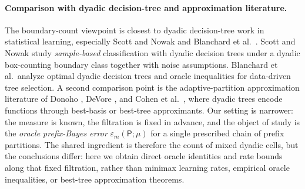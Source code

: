 \paragraph{Comparison with dyadic decision-tree and approximation literature.}
The boundary-count viewpoint is closest to dyadic decision-tree work in
statistical learning, especially Scott and Nowak \cite{ScottNowak2006} and
Blanchard et al.~\cite{BlanchardSchaferRozenholcMuller2007}.  Scott and
Nowak study \emph{sample-based} classification with dyadic decision trees
under a dyadic box-counting boundary class together with noise assumptions.
Blanchard et al.\ analyze optimal dyadic decision trees and oracle
inequalities for data-driven tree selection.  A second comparison point is
the adaptive-partition approximation literature of Donoho
\cite{Donoho1997}, DeVore \cite{DeVore1998}, and Cohen et al.\
\cite{CohenDahmenDaubechiesDeVore2001}, where dyadic trees encode functions
through best-basis or best-tree approximants.  Our setting is narrower: the
measure is known, the filtration is fixed in advance, and the object of study
is the \emph{oracle prefix-Bayes error} $\varepsilon_m(\mathsf{P};\mu)$ for a
single prescribed chain of prefix partitions.  The shared ingredient is
therefore the count of mixed dyadic cells, but the conclusions differ:
here we obtain direct oracle identities and rate bounds along that fixed
filtration, rather than minimax learning rates, empirical oracle
inequalities, or best-tree approximation theorems.

